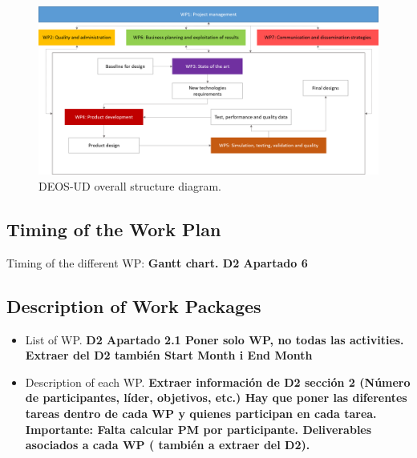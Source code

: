 \begin{figure}[H]
\centering
\includegraphics[width=\textwidth]{images/overallstructure.png}
\caption{DEOS-UD overall structure diagram.} 
\label{overallstructure}
\end{figure}

\subsection{Timing of the Work Plan}

Timing of the different WP: \textbf{Gantt chart. D2 Apartado 6}

\subsection{Description of Work Packages}

\begin{itemize}

\item List of WP. \textbf{D2 Apartado 2.1 Poner solo WP, no todas las activities. Extraer del D2 también Start Month i End Month}

\item Description of each WP. \textbf{Extraer información de D2 sección 2 (Número de participantes, líder, objetivos, etc.) Hay que poner las diferentes tareas dentro de cada WP y quienes participan en cada tarea. Importante: Falta calcular PM por participante. Deliverables asociados a cada WP ( también a extraer del D2).}

\end{itemize}

